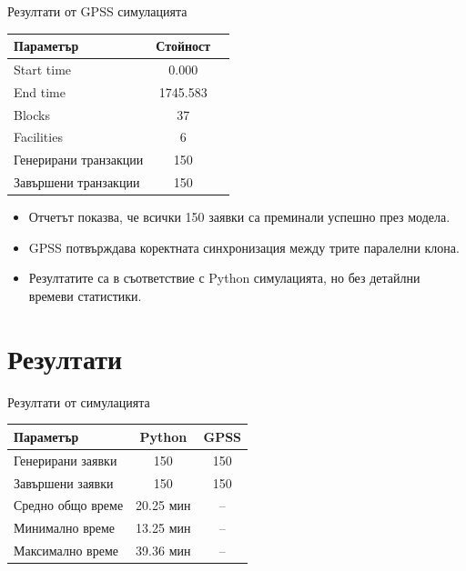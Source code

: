 \documentclass[aspectratio=169]{beamer}
\begin{document}
\begin{frame}{Резултати от GPSS симулацията}
    \begin{table}[ht]
        \centering
        \begin{tabular}{lcc}
            \toprule
            Параметър & Стойност \\
            \midrule
            Start time & 0.000 \\
            End time & 1745.583 \\
            Blocks & 37 \\
            Facilities & 6 \\
            Генерирани транзакции & 150 \\
            Завършени транзакции & 150 \\
            \bottomrule
        \end{tabular}
    \end{table}

    \vspace{0.3cm}

    \begin{itemize}
        \item Отчетът показва, че всички 150 заявки са преминали успешно през модела.
        \item GPSS потвърждава коректната синхронизация между трите паралелни клона.
        \item Резултатите са в съответствие с Python симулацията, но без детайлни времеви статистики.
    \end{itemize}
\end{frame}

\section{Резултати}

\begin{frame}{Резултати от симулацията}
    \begin{table}[ht]
        \centering
        \begin{tabular}{lcc}
            \toprule
            Параметър & Python & GPSS \\
            \midrule
            Генерирани заявки & 150 & 150 \\
            Завършени заявки & 150 & 150 \\
            Средно общо време & 20.25 мин & -- \\
            Минимално време & 13.25 мин & -- \\
            Максимално време & 39.36 мин & -- \\
            \bottomrule
        \end{tabular}
    \end{table}
\end{frame}
\end{document}

